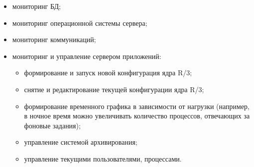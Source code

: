 \begin{itemize}
	\item мониторинг БД; 
	\item мониторинг операционной системы сервера; 
	\item мониторинг коммуникаций;
	\item мониторинг и управление сервером приложений:
	\begin{itemize}
		\item формирование и запуск новой конфигурация ядра R/3; 
		\item снятие и редактирование текущей конфигурации ядра R/3; 
		\item формирование временного графика в зависимости от нагрузки (например, в ночное время можно увеличивать количество процессов, отвечающих за фоновые задания); 
		\item управление системой архивирования; 
		\item управление текущими пользователями, процессами. 
	\end{itemize}
\end{itemize}


